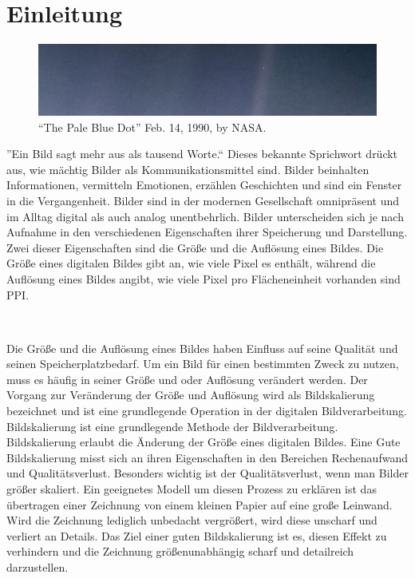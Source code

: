 



\chapter{Einleitung}
    
    \begin{center}
        \begin{figure}[h]
            \includegraphics[width=\textwidth]{img/PIA23645_PaleBlueDotRevisited_1600.jpg}
            \caption{``The Pale Blue Dot'' Feb. 14, 1990, by NASA\footnotemark.}
            \vspace{-6mm}
            \label{fig:my_label}
        \end{figure}
    \end{center}
    
    ''Ein Bild sagt mehr aus als tausend Worte.`` Dieses bekannte Sprichwort drückt aus, wie mächtig Bilder als Kommunikationsmittel sind. 
    Bilder beinhalten Informationen, vermitteln Emotionen, erzählen Geschichten und sind ein Fenster in die Vergangenheit. 
    Bilder sind in der modernen Gesellschaft omnipräsent und im Alltag digital als auch analog unentbehrlich.
    Bilder unterscheiden sich je nach Aufnahme in den verschiedenen Eigenschaften ihrer Speicherung und Darstellung. 
    Zwei dieser Eigenschaften sind die Größe und die Auflösung eines Bildes. 
    Die Größe eines digitalen Bildes gibt an, wie viele Pixel es enthält, während die Auflösung eines Bildes angibt, wie viele Pixel pro Flächeneinheit vorhanden sind \ac{PPI}.
    
    ~
    
    Die Größe und die Auflösung eines Bildes haben Einfluss auf seine Qualität und seinen Speicherplatzbedarf. 
    Um ein Bild für einen bestimmten Zweck zu nutzen, muss es häufig in seiner Größe und oder Auflösung verändert werden. 
    Der Vorgang zur Veränderung der Größe und Auflösung wird als Bildskalierung bezeichnet und ist eine grundlegende Operation in der digitalen Bildverarbeitung.
    Bildskalierung ist eine grundlegende Methode der Bildverarbeitung. Bildskalierung erlaubt die Änderung der Größe eines digitalen Bildes.
    Eine Gute Bildskalierung misst sich an ihren Eigenschaften in den Bereichen Rechenaufwand und Qualitätsverlust. 
    Besonders wichtig ist der Qualitätsverlust, wenn man Bilder größer skaliert. 
    Ein geeignetes Modell um diesen Prozess zu erklären ist das übertragen einer Zeichnung von einem kleinen Papier auf eine große Leinwand. 
    Wird die Zeichnung lediglich unbedacht vergrößert, wird diese unscharf und verliert an Details. 
    Das Ziel einer guten Bildskalierung ist es, diesen Effekt zu verhindern und die Zeichnung größenunabhängig scharf und detailreich darzustellen.
    
